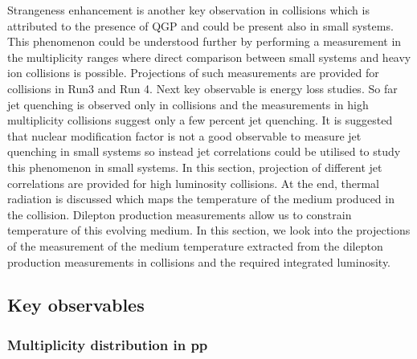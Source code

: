\documentclass[../report.tex]{subfiles}
\begin{document}
\noindent Strangeness enhancement is another key observation in \PbPb{} collisions which is attributed to the presence of QGP and could be present also in small systems. This phenomenon could be understood further by performing a measurement in the multiplicity ranges where direct comparison between small systems and heavy ion collisions is possible. Projections of such measurements are provided for \pp{} collisions in Run3 and Run 4. Next key observable is energy loss studies. So far jet quenching is observed only in \PbPb{} collisions and the measurements in high multiplicity \pPb{} collisions suggest only a few percent jet quenching. It is suggested that nuclear modification factor is not a good observable to measure jet quenching in small systems so instead jet correlations could be utilised to study this phenomenon in small systems. In this section, projection of different jet correlations are provided for high luminosity \pp{} collisions. At the end, thermal radiation is discussed which maps the temperature of the medium produced in the collision. Dilepton production measurements allow us to constrain temperature of this evolving medium. In this section, we look into the projections of the measurement of the medium temperature extracted from the dilepton production measurements in \pPb{} collisions and the required integrated luminosity. 





\subsection{Key observables}

\subsubsection{Multiplicity distribution in pp}
\end{document}
